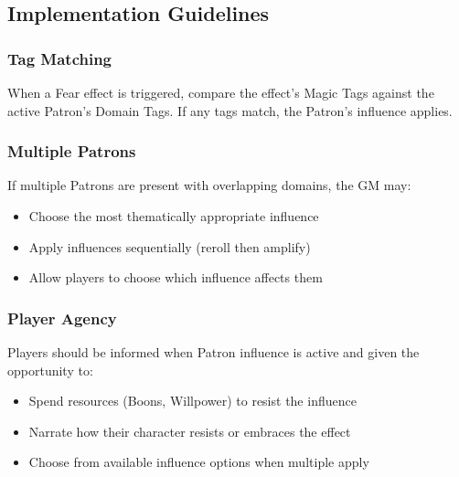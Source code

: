 \subsection{Implementation Guidelines}
\label{subsec:patron-fear-guidelines}

\subsubsection{Tag Matching}
When a Fear effect is triggered, compare the effect's Magic Tags against the active Patron's Domain Tags. If any tags match, the Patron's influence applies.

\subsubsection{Multiple Patrons}
If multiple Patrons are present with overlapping domains, the GM may:
\begin{itemize}
  \item Choose the most thematically appropriate influence
  \item Apply influences sequentially (reroll then amplify)
  \item Allow players to choose which influence affects them
\end{itemize}

\subsubsection{Player Agency}
Players should be informed when Patron influence is active and given the opportunity to:
\begin{itemize}
  \item Spend resources (Boons, Willpower) to resist the influence
  \item Narrate how their character resists or embraces the effect
  \item Choose from available influence options when multiple apply
\end{itemize}